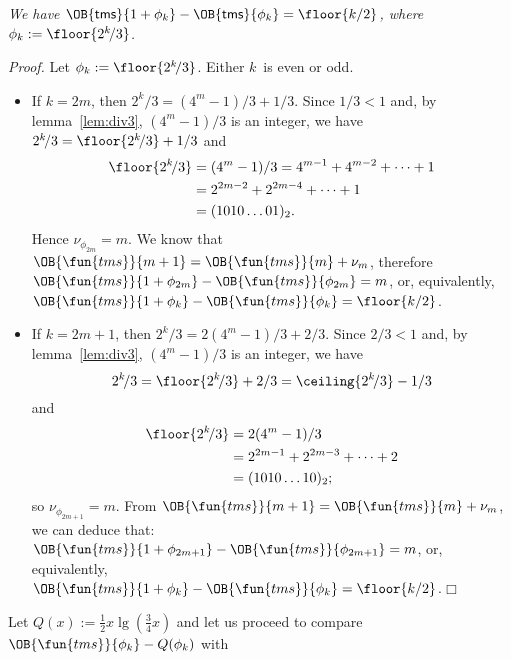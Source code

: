 \begin{thm}
\label{thm:OB_lambda}
\textsl{We have \(\OB{\mathsf{tms}}{1+\phi_k} -
  \OB{\mathsf{tms}}{\phi_k} = \floor{k/2}\), where \(\phi_k :=
  \floor{2^k\!/3}\).}
\end{thm}
\noindent \emph{Proof.} Let \(\phi_k := \floor{2^k\!/3}\). Either
\(k\)~is even or odd.
\begin{itemize}

  \item If \(k=2m\), then \(2^k\!/3 = (4^m-1)/3 + 1/3\). Since
    \(1/3<1\) and, by lemma~\ref{lem:div3}, \((4^m-1)/3\) is an
    integer, we have \(2^k\!/3 = \floor{2^k\!/3} + 1/3\) and
    \begin{align*}
      \floor{2^k\!/3} &= (4^m-1)/3 = 4^{m-1} + 4^{m-2} + \dots + 1\\
                      &= 2^{2m-2} + 2^{2m-4} + \dots + 1\\
                      &= (1010\dots01)_2.
    \end{align*}
    Hence \(\nu_{\phi_{2m}} = m\). We know that \(\OB{\fun{tms}}{m+1} =
    \OB{\fun{tms}}{m} + \nu_m\), therefore
    \(\OB{\fun{tms}}{1+\phi_{2m}} - \OB{\fun{tms}}{\phi_{2m}} = m\),
    or, equivalently, \(\OB{\fun{tms}}{1+\phi_k} -
    \OB{\fun{tms}}{\phi_k} = \floor{k/2}\).

  \item If \(k=2m+1\), then \(2^k\!/3 = 2(4^m-1)/3 + 2/3\). Since
    \(2/3<1\) and, by lemma~\ref{lem:div3}, \((4^m-1)/3\) is an
    integer, we have
    \begin{equation*}
      2^k\!/3 = \floor{2^k\!/3} + 2/3 = \ceiling{2^k\!/3} - 1/3
    \end{equation*}
    and
    \begin{align*}
      \floor{2^k\!/3} &= 2(4^m-1)/3\\
                      &= 2^{2m-1} + 2^{2m-3} + \dots + 2\\
                      &= (1010\dots10)_2;
    \end{align*}
    so \(\nu_{\phi_{2m+1}} = m\). From \(\OB{\fun{tms}}{m+1} =
    \OB{\fun{tms}}{m} + \nu_m\), we can deduce that:
    \(\OB{\fun{tms}}{1+\phi_{2m+1}} - \OB{\fun{tms}}{\phi_{2m+1}} =
    m\), or, equivalently,
    \(\OB{\fun{tms}}{1+\phi_k} - \OB{\fun{tms}}{\phi_k} =
    \floor{k/2}\).\hfill\(\Box\)

\end{itemize}
\noindent Let \(Q(x) := \tfrac{1}{2}x\lg(\tfrac{3}{4}x)\) and let us
proceed to compare \(\OB{\fun{tms}}{\phi_k} - Q(\phi_k)\) with
